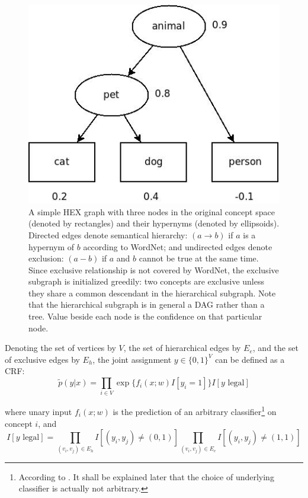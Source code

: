 \documentclass[11pt,a4paper]{article}
\begin{document}
\begin{figure}[h]
\centering
\includegraphics[scale=0.5]{naive.jpeg}
\caption{A simple HEX graph with three nodes in the original concept space (denoted by rectangles) and their hypernyms (denoted by ellipsoids). Directed edges denote semantical hierarchy: $(a\rightarrow b)$ if $a$ is a hypernym of $b$ according to WordNet; and undirected edges denote exclusion: $(a-b)$ if $a$ and $b$ cannot be true at the same time. Since exclusive relationship is not covered by WordNet, the exclusive subgraph is initialized greedily: two concepts are exclusive unless they share a common descendant in the hierarchical subgraph. Note that the hierarchical subgraph is in general a DAG rather than a tree. Value beside each node is the confidence on that particular node.}
\label{fig:naive}
\end{figure}

Denoting the set of vertices by $V$, the set of hierarchical edges by $E_e$, and the set of exclusive edges by $E_h$, the joint assignment $y\in\{0,1\}^V$ can be defined as a CRF:
\[\tilde{p}(y|x)=\prod_{i\in V}\exp\{f_i(x;w)I[y_i=1]\}I[y\text{ legal}]\]

where unary input $f_i(x;w)$ is the prediction of an arbitrary classifier\footnote{According to \cite{deng2014large}. It shall be explained later that the choice of underlying classifier is actually not arbitrary.} on concept $i$, and
\[I[y\text{ legal}]=\prod_{(v_i,v_j)\in E_h}I[(y_i,y_j)\neq(0,1)]\prod_{(v_i,v_j)\in E_e}I[(y_i,y_j)\neq(1,1)]\]
\end{document}

